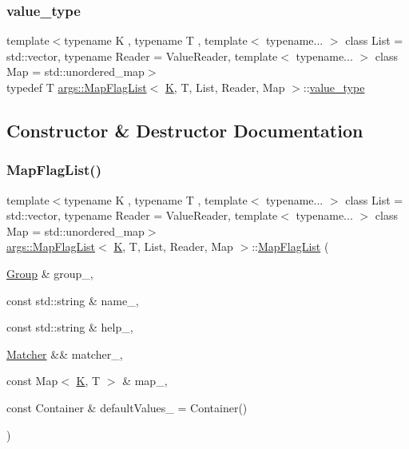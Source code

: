 \subsubsection{\texorpdfstring{value\+\_\+type}{value\_type}}
{\footnotesize\ttfamily template$<$typename K , typename T , template$<$ typename... $>$ class List = std\+::vector, typename Reader  = Value\+Reader, template$<$ typename... $>$ class Map = std\+::unordered\+\_\+map$>$ \\
typedef T \hyperlink{classargs_1_1_map_flag_list}{args\+::\+Map\+Flag\+List}$<$ \hyperlink{cgal__test_8cpp_a891e241aa245ae63618f03737efba309}{K}, T, List, Reader, Map $>$\+::\hyperlink{classargs_1_1_map_flag_list_a6c8d512f511bdcfac07e0394ca187d67}{value\+\_\+type}}



\subsection{Constructor \& Destructor Documentation}
\mbox{\label{classargs_1_1_map_flag_list_a8a7d44c211928287ced52601a30268c9}} 
\subsubsection{\texorpdfstring{Map\+Flag\+List()}{MapFlagList()}}
{\footnotesize\ttfamily template$<$typename K , typename T , template$<$ typename... $>$ class List = std\+::vector, typename Reader  = Value\+Reader, template$<$ typename... $>$ class Map = std\+::unordered\+\_\+map$>$ \\
\hyperlink{classargs_1_1_map_flag_list}{args\+::\+Map\+Flag\+List}$<$ \hyperlink{cgal__test_8cpp_a891e241aa245ae63618f03737efba309}{K}, T, List, Reader, Map $>$\+::\hyperlink{classargs_1_1_map_flag_list}{Map\+Flag\+List} (\begin{DoxyParamCaption}\item[{\hyperlink{classargs_1_1_group}{Group} \&}]{group\+\_\+,  }\item[{const std\+::string \&}]{name\+\_\+,  }\item[{const std\+::string \&}]{help\+\_\+,  }\item[{\hyperlink{classargs_1_1_matcher}{Matcher} \&\&}]{matcher\+\_\+,  }\item[{const Map$<$ \hyperlink{cgal__test_8cpp_a891e241aa245ae63618f03737efba309}{K}, T $>$ \&}]{map\+\_\+,  }\item[{const Container \&}]{default\+Values\+\_\+ = {\ttfamily Container()} }\end{DoxyParamCaption})\hspace{0.3cm}{\ttfamily [inline]}}

